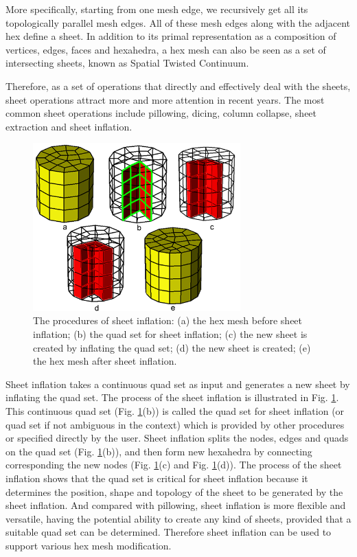 \documentclass[final,5p,times,twocolumn]{elsarticle}
\begin{document}
More specifically, starting from one mesh edge, we recursively get all its topologically parallel mesh edges. All of these mesh edges along with the adjacent hex define a sheet. In addition to its primal representation as a composition of vertices, edges, faces and hexahedra, a hex mesh can also be seen as a set of intersecting sheets, known as Spatial Twisted Continuum\cite{Murdoch:1997fy}.

Therefore, as a set of operations that directly and effectively deal with the sheets, sheet operations attract more and more attention in recent years. The most common sheet operations include pillowing\cite{Mitchell:1995wa}, dicing\cite{melander1997generation}, column collapse\cite{Staten:2009bo}, sheet extraction\cite{Staten:2009bo,Borden:2002hs} and sheet inflation\cite{Staten:2009bo,Ledoux:2009jz,staten2010sheet}.

\begin{figure}[htbp]
\begin{center}
\includegraphics[width=8cm]{sheet_inflation.png}
\caption{The procedures of sheet inflation: (a) the hex mesh before sheet inflation; (b) the quad set for sheet inflation; (c) the new sheet is created by inflating the quad set; (d) the new sheet is created; (e) the hex mesh after sheet inflation.}
\label{fig:sheet_inflation}
\end{center}
\end{figure}

Sheet inflation takes a continuous quad set as input and generates a new sheet by inflating the quad set. The process of the sheet inflation is illustrated in Fig. \ref{fig:sheet_inflation}. This continuous quad set (Fig. \ref{fig:sheet_inflation}(b)) is called the quad set for sheet inflation (or quad set if not ambiguous in the context) which is provided by other procedures or specified directly by the user. Sheet inflation splits the nodes, edges and quads on the quad set (Fig. \ref{fig:sheet_inflation}(b)), and then form new hexahedra by connecting corresponding the new nodes (Fig. \ref{fig:sheet_inflation}(c) and Fig. \ref{fig:sheet_inflation}(d)). The process of the sheet inflation shows that the quad set is critical for sheet inflation because it determines the position, shape and topology of the sheet to be generated by the sheet inflation. And compared with pillowing, sheet inflation is more flexible and versatile, having the potential ability to create any kind of sheets, provided that a suitable quad set can be determined. Therefore sheet inflation can be used to support various hex mesh modification.
\end{document}

